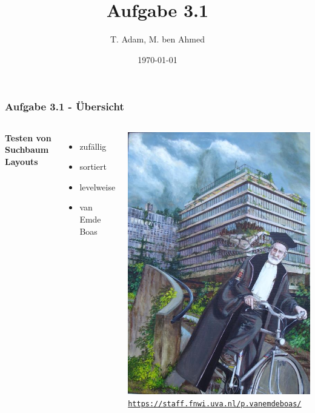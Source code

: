 \documentclass[aspectratio=169]{beamer}
\title[Aufgabe 1.1]{Aufgabe 3.1} %
\author{T. Adam, M. ben Ahmed} %
\institute[UOS] %
{

Universität Osnabrück \\ %

\medskip
\textit{Æ} %


}
\date{\today} %
\begin{document}
\begin{frame}
\titlepage %
\end{frame}







\begin{frame}
	\frametitle{Aufgabe 3.1 - Übersicht}
	\begin{columns}[c] %
		
		\textbf{Testen von Suchbaum Layouts}
		\begin{itemize}
			\item zufällig
			\item sortiert
			\item levelweise
			\item van Emde Boas
		\end{itemize}

		\includegraphics[scale=.2]{portretPeter.jpg}
		\tiny \texttt{\url{https://staff.fnwi.uva.nl/p.vanemdeboas/}}
		

\end{columns}
\end{frame}
\end{document}

